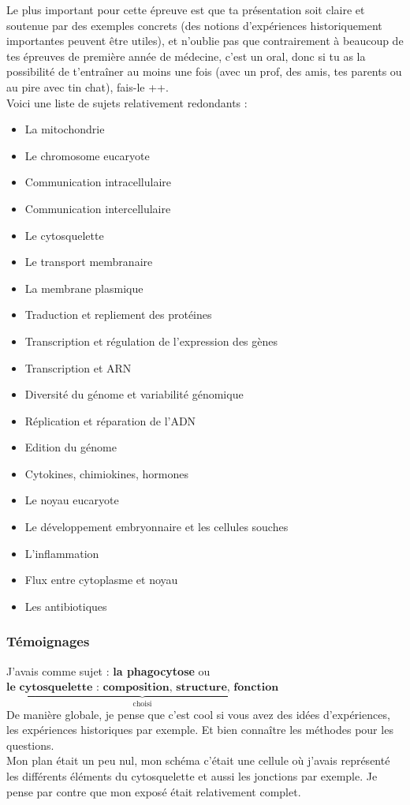 Le plus important pour cette épreuve est que ta présentation soit claire et soutenue par des exemples concrets (des notions d’expériences historiquement importantes peuvent être utiles), et n’oublie pas que contrairement à beaucoup de tes épreuves de première année de médecine, c’est un oral, donc si tu as la possibilité de t'entraîner au moins une fois (avec un prof, des amis, tes parents ou au pire avec tin chat), fais-le ++.\\

Voici une liste de sujets relativement redondants : 

\begin{itemize}
\item La mitochondrie
\item Le chromosome eucaryote
\item Communication intracellulaire
\item Communication intercellulaire 
\item Le cytosquelette
\item Le transport membranaire
\item La membrane plasmique
\item Traduction et repliement des protéines
\item Transcription et régulation de l’expression des gènes 
\item Transcription et ARN
\item Diversité du génome et variabilité génomique
\item Réplication et réparation de l’ADN
\item Edition du génome
\item Cytokines, chimiokines, hormones
\item Le noyau eucaryote
\item Le développement embryonnaire et les cellules souches
\item L’inflammation
\item Flux entre cytoplasme et noyau
\item Les antibiotiques
\end{itemize}

\subsubsection{Témoignages}

\lettrine{{\color{violet} \oldpilcrowfive}}{}
J’avais comme sujet : \textbf{la phagocytose} ou $\underbrace{\textbf{le cytosquelette : composition, structure, fonction}}_{\text{choisi}}$\\
De manière globale, je pense que c’est cool si vous avez des idées d’expériences, les expériences historiques par exemple. Et bien connaître les méthodes pour les questions.\\
Mon plan était un peu nul, mon schéma c’était une cellule où j’avais représenté les différents éléments du cytosquelette et aussi les jonctions par exemple. Je pense par contre que mon exposé était relativement complet.\\


